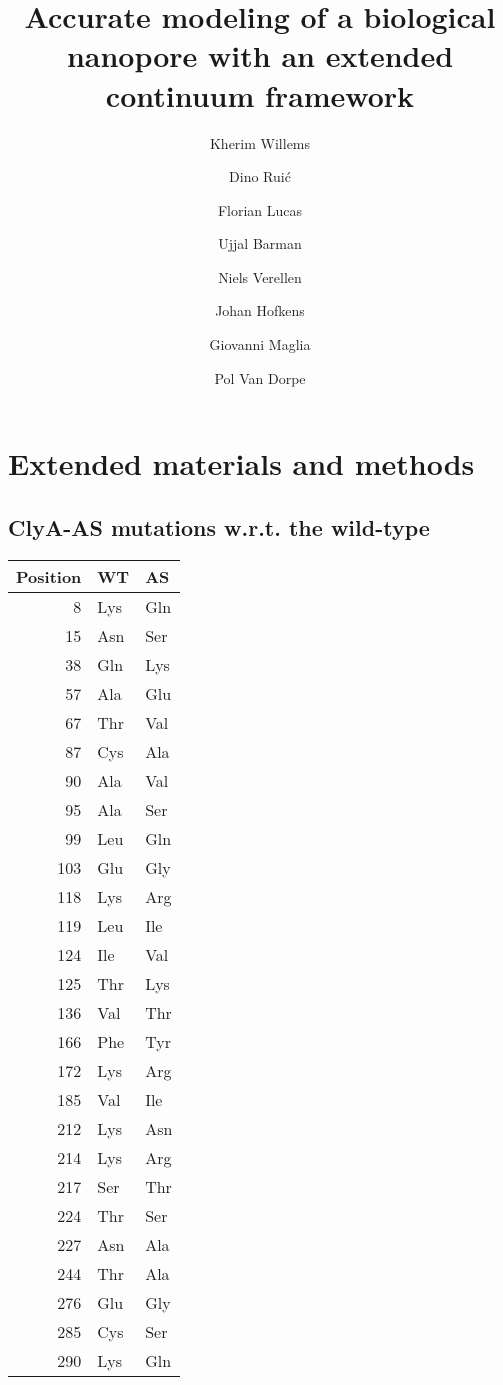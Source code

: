 \documentclass[journal=ancac3, manuscript=suppinfo, etalmode=truncate,maxauthors=0]{achemso}
\title{Accurate modeling of a biological nanopore with an extended continuum framework}
\author{Kherim Willems}
\affiliation{\afkulchem}
\author{Dino Rui\'{c}}
\affiliation{\afkulphys}
\author{Florian Lucas}
\affiliation{\afrug}
\author{Ujjal Barman}
\affiliation{\afimec}
\author{Niels Verellen}
\affiliation{\afimec}
\author{Johan Hofkens}
\affiliation{\afkulchem}
\author{Giovanni Maglia}
\affiliation{\afrug}
\author{Pol Van Dorpe}
\affiliation{\afkulchem}
\begin{document}
\maketitle

\newpage

\tableofcontents

\newpage

\newpage
\section{Extended materials and methods}

\subsection{ClyA-AS mutations w.r.t. the wild-type}

\begin{table*}[h]
	\renewcommand{\arraystretch}{1.5}
	\scriptsize
	\caption{Mutations of the ClyA-AS variant compared to the \textit{S. tyhpii} wild-type.}
	\centering
	\label{tab:clya_as_mutations}
	\begin{tabular}{rll}
		\toprule
		Position	& WT	& AS \\
		\midrule
		8			& Lys	& Gln	\\
		15			& Asn	& Ser	\\
		38			& Gln	& Lys	\\
		57			& Ala	& Glu 	\\
		67			& Thr	& Val 	\\
		87			& Cys	& Ala 	\\
		90			& Ala	& Val	\\
		95			& Ala	& Ser 	\\
		99			& Leu	& Gln 	\\
		103	 		& Glu	& Gly	\\
		118			& Lys	& Arg 	\\
		119			& Leu	& Ile	\\
		124			& Ile	& Val	\\
		125			& Thr	& Lys	\\
		136			& Val	& Thr	\\
		166			& Phe	& Tyr	\\
		172			& Lys	& Arg	\\
		185			& Val	& Ile	\\
		212			& Lys	& Asn	\\
		214			& Lys	& Arg	\\
		217			& Ser	& Thr	\\
		224			& Thr	& Ser	\\
		227			& Asn	& Ala	\\
		244			& Thr 	& Ala	\\
		276			& Glu	& Gly	\\
		285			& Cys	& Ser	\\
		290			& Lys	& Gln	\\
		\bottomrule
	\end{tabular}
\end{table*}
\end{document}
